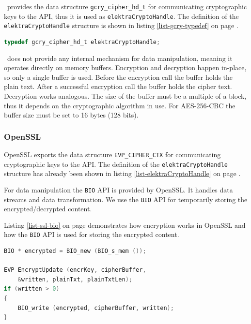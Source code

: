 \gcry ~provides the data structure \texttt{gcry\_cipher\_hd\_t} for communicating cryptographic keys to the API, thus it is used as \texttt{elektraCryptoHandle}.
The definition of the \texttt{elektraCryptoHandle} structure is shown in listing \ref{list-gcry-typedef} on page \pageref{list-gcry-typedef}.

\begin{lstlisting}[label=list-gcry-typedef,language=C,caption={Definiton of elektraCryptoHandle for the libgcrypt crypto plugin variant}]
typedef gcry_cipher_hd_t elektraCryptoHandle;
\end{lstlisting}

\gcry ~does not provide any internal mechanism for data manipulation, meaning it operates directly on memory buffers.
Encryption and decryption happen in-place, so only a single buffer is used.
Before the encryption call the buffer holds the plain text.
After a successful encryption call the buffer holds the cipher text.
Decryption works analogous.
The size of the buffer must be a multiple of a block, thus it depends on the cryptographic algorithm in use.
For AES-256-CBC the buffer size must be set to 16 bytes (128 bits).
\cite{gnupg-doc}

\subsubsection*{OpenSSL}

OpenSSL exports the data structure \texttt{EVP\_CIPHER\_CTX} for communicating cryptographic keys to the API. The definition of the \texttt{elektraCryptoHandle} structure has already been shown in listing \ref{list-elektraCryptoHandle} on page \pageref{list-elektraCryptoHandle}.

For data manipulation the \texttt{BIO} API is provided by OpenSSL.
It handles data streams and data transformation.
We use the \texttt{BIO} API for temporarily storing the encrypted/decrypted content.

Listing \ref{list-ssl-bio} on page \pageref{list-ssl-bio} demonstrates how encryption works in OpenSSL and how the \texttt{BIO} API is used for storing the encrypted content. 

\begin{lstlisting}[label=list-ssl-bio,language=C,caption={Encryption in the OpenSSL crypto plugin variant}]
BIO * encrypted = BIO_new (BIO_s_mem ());

EVP_EncryptUpdate (encrKey, cipherBuffer, 
	&written, plainTxt, plainTxtLen);
if (written > 0)
{
	BIO_write (encrypted, cipherBuffer, written);
}
\end{lstlisting}

